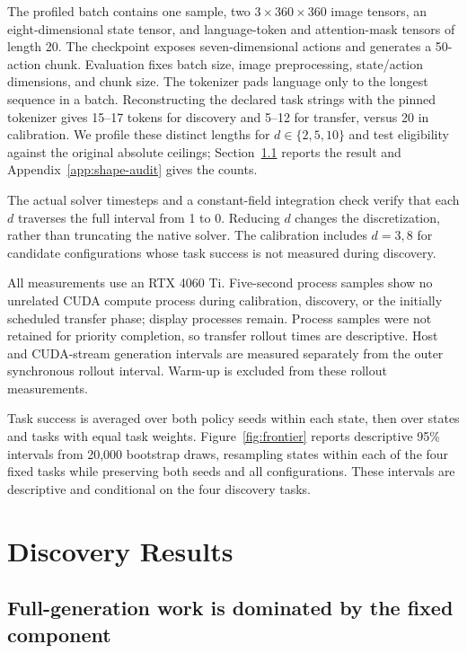 \documentclass{article}
\begin{document}
The profiled batch contains one sample, two $3\times360\times360$ image tensors,
an eight-dimensional state tensor, and language-token and attention-mask tensors
of length 20. The checkpoint exposes seven-dimensional actions and generates a
50-action chunk. Evaluation fixes batch size, image preprocessing, state/action
dimensions, and chunk size. The tokenizer pads language only to the longest
sequence in a batch. Reconstructing the declared task strings with the pinned
tokenizer gives 15--17 tokens for discovery and 5--12 for transfer, versus 20
in calibration. We profile these distinct lengths for $d\in\{2,5,10\}$ and
test eligibility against the original absolute ceilings; Section~\ref{sec:results}
reports the result and Appendix~\ref{app:shape-audit} gives the counts.

The actual solver timesteps and a constant-field integration check verify that
each $d$ traverses the full interval from 1 to 0. Reducing $d$ changes the
discretization, rather than truncating the native solver. The calibration
includes $d=3,8$ for candidate configurations whose task success is not measured
during discovery.

All measurements use an RTX 4060 Ti. Five-second process samples show no
unrelated CUDA compute process during calibration, discovery, or the initially
scheduled transfer phase; display processes remain. Process samples were not
retained for priority completion, so transfer rollout times are descriptive.
Host and CUDA-stream generation intervals are measured separately
from the outer synchronous rollout interval. Warm-up is excluded from these
rollout measurements.

Task success is averaged over both policy seeds within each state, then over
states and tasks with equal task weights. Figure~\ref{fig:frontier} reports
descriptive 95\% intervals from 20,000 bootstrap draws, resampling states within
each of the four fixed tasks while preserving both seeds and all configurations.
These intervals are descriptive and conditional on the four discovery tasks.

\section{Discovery Results}

\subsection{Full-generation work is dominated by the fixed component}
\label{sec:results}
\end{document}
